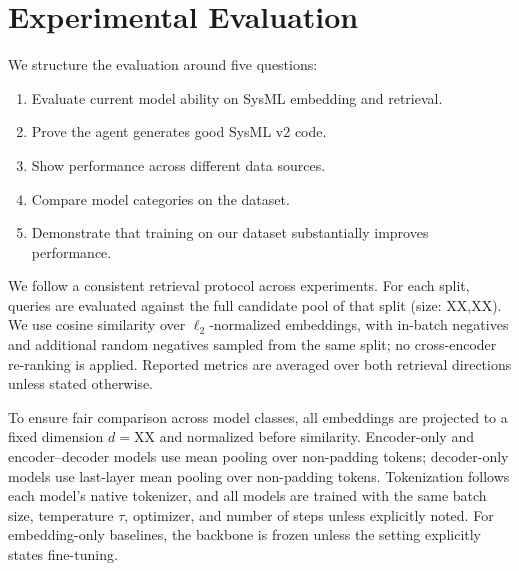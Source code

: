 \documentclass{article}
\begin{document}
\section{Experimental Evaluation}
\label{sec:experiments}

We structure the evaluation around five questions:
\begin{enumerate}
\item Evaluate current model ability on SysML embedding and retrieval.
\item Prove the agent generates good SysML v2 code.
\item Show performance across different data sources.
\item Compare model categories on the dataset.
\item Demonstrate that training on our dataset substantially improves performance.
\end{enumerate}

We follow a consistent retrieval protocol across experiments. For each split, queries are evaluated against the full candidate pool of that split (size: XX,XX). We use cosine similarity over $\ell_2$-normalized embeddings, with in-batch negatives and additional random negatives sampled from the same split; no cross-encoder re-ranking is applied. Reported metrics are averaged over both retrieval directions unless stated otherwise.

To ensure fair comparison across model classes, all embeddings are projected to a fixed dimension $d=\text{XX}$ and normalized before similarity. Encoder-only and encoder--decoder models use mean pooling over non-padding tokens; decoder-only models use last-layer mean pooling over non-padding tokens. Tokenization follows each model's native tokenizer, and all models are trained with the same batch size, temperature $\tau$, optimizer, and number of steps unless explicitly noted. For embedding-only baselines, the backbone is frozen unless the setting explicitly states fine-tuning.
\end{document}
